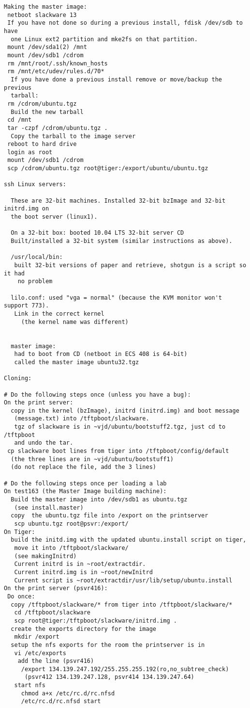\begin{verbatim}
Making the master image:
 netboot slackware 13
 If you have not done so during a previous install, fdisk /dev/sdb to have
  one Linux ext2 partition and mke2fs on that partition.
 mount /dev/sda1(2) /mnt
 mount /dev/sdb1 /cdrom
 rm /mnt/root/.ssh/known_hosts
 rm /mnt/etc/udev/rules.d/70*
  If you have done a previous install remove or move/backup the previous
  tarball:
 rm /cdrom/ubuntu.tgz
  Build the new tarball
 cd /mnt
 tar -czpf /cdrom/ubuntu.tgz .
  Copy the tarball to the image server
 reboot to hard drive
 login as root
 mount /dev/sdb1 /cdrom
 scp /cdrom/ubuntu.tgz root@tiger:/export/ubuntu/ubuntu.tgz

ssh Linux servers:

  These are 32-bit machines. Installed 32-bit bzImage and 32-bit initrd.img on
  the boot server (linux1).

  On a 32-bit box: booted 10.04 LTS 32-bit server CD
  Built/installed a 32-bit system (similar instructions as above).

  /usr/local/bin:
   built 32-bit versions of paper and retrieve, shotgun is a script so it had
    no problem

  lilo.conf: used "vga = normal" (because the KVM monitor won't support 773).
   Link in the correct kernel
     (the kernel name was different)


  master image:
   had to boot from CD (netboot in ECS 408 is 64-bit)
   called the master image ubuntu32.tgz

Cloning:

# Do the following steps once (unless you have a bug):
On the print server:
  copy in the kernel (bzImage), initrd (initrd.img) and boot message
   (message.txt) into /tftpboot/slackware.
   tgz of slackware is in ~vjd/ubuntu/bootstuff2.tgz, just cd to /tftpboot
   and undo the tar.
 cp slackware boot lines from tiger into /tftpboot/config/default
  (the three lines are in ~vjd/ubuntu/bootstuff1)
  (do not replace the file, add the 3 lines)

# Do the following steps once per loading a lab
On test163 (the Master Image building machine):
  Build the master image into /dev/sdb1 as ubuntu.tgz
   (see install.master)
  copy  the ubuntu.tgz file into /export on the printserver
   scp ubuntu.tgz root@psvr:/export/
On Tiger:
  build the initd.img with the updated ubuntu.install script on tiger,
   move it into /tftpboot/slackware/
   (see makingInitrd)
   Current initrd is in ~root/extractdir.
   Current initrd.img is in ~root/newInitrd
   Current script is ~root/extractdir/usr/lib/setup/ubuntu.install
On the print server (psvr416):
 Do once:
  copy /tftpboot/slackware/* from tiger into /tftpboot/slackware/*
   cd /tftpboot/slackware
   scp root@tiger:/tftpboot/slackware/initrd.img .
  create the exports directory for the image
   mkdir /export
  setup the nfs exports for the room the printserver is in
   vi /etc/exports
    add the line (psvr416)
     /export 134.139.247.192/255.255.255.192(ro,no_subtree_check)
      (psvr412 134.139.247.128, psvr414 134.139.247.64)
   start nfs
     chmod a+x /etc/rc.d/rc.nfsd
     /etc/rc.d/rc.nfsd start
   

\end{verbatim}
